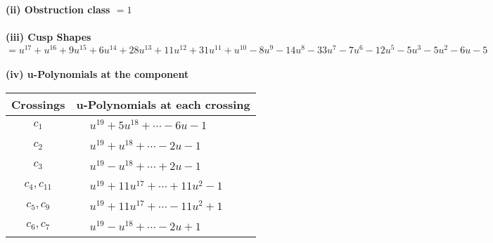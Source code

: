 \documentclass[1p]{elsarticle_modified}
\theoremstyle{definition}
\begin{document}
\flushleft \textbf{(ii) Obstruction class $= 1$}\\~\\
\flushleft \textbf{(iii) Cusp Shapes $= u^{17}+u^{16}+9 u^{15}+6 u^{14}+28 u^{13}+11 u^{12}+31 u^{11}+u^{10}-8 u^9-14 u^8-33 u^7-7 u^6-12 u^5-5 u^3-5 u^2-6 u-5$}\\~\\
\newpage\renewcommand{\arraystretch}{1}
\flushleft \textbf{(iv) u-Polynomials at the component}\newline \\
\begin{tabular}{m{50pt}|m{274pt}}
Crossings & \hspace{64pt}u-Polynomials at each crossing \\
\hline $$\begin{aligned}c_{1}\end{aligned}$$&$\begin{aligned}
&u^{19}+5 u^{18}+\cdots-6 u-1
\end{aligned}$\\
\hline $$\begin{aligned}c_{2}\end{aligned}$$&$\begin{aligned}
&u^{19}+u^{18}+\cdots-2 u-1
\end{aligned}$\\
\hline $$\begin{aligned}c_{3}\end{aligned}$$&$\begin{aligned}
&u^{19}- u^{18}+\cdots+2 u-1
\end{aligned}$\\
\hline $$\begin{aligned}c_{4},c_{11}\end{aligned}$$&$\begin{aligned}
&u^{19}+11 u^{17}+\cdots+11 u^2-1
\end{aligned}$\\
\hline $$\begin{aligned}c_{5},c_{9}\end{aligned}$$&$\begin{aligned}
&u^{19}+11 u^{17}+\cdots-11 u^2+1
\end{aligned}$\\
\hline $$\begin{aligned}c_{6},c_{7}\end{aligned}$$&$\begin{aligned}
&u^{19}- u^{18}+\cdots-2 u+1
\end{aligned}$\\

\end{tabular}
\end{document}
